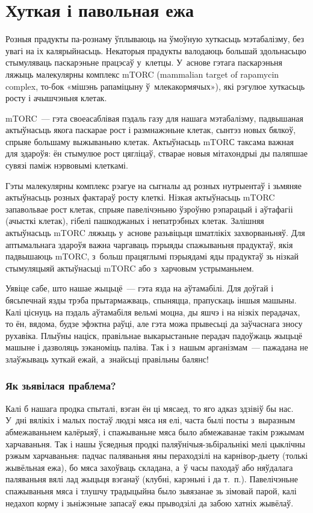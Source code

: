 \chapter{Хуткая і павольная ежа}

Розныя прадукты па-рознаму ўплываюць на ўмоўную хуткасьць мэтабалізму, без увагі на іх калярыйнасьць. Некаторыя прадукты валодаюць большай здольнасьцю стымуляваць паскарэньне працэсаў у~клетцы. У~аснове гэтага паскарэньня ляжыць малекулярны комплекс mTORC (mammalian target of rapamycin complex, то-бок «мішэнь рапаміцыну ў~млекакормячых»), які рэгулюе хуткасьць росту і ачышчэньня клетак.
 
mTORC~--- гэта своеасаблівая пэдаль газу для нашага мэтабалізму, падвышаная актыўнасьць якога паскарае рост і размнажэньне клетак, сынтэз новых бялкоў, спрыяе большаму выжываньню клетак. Актыўнасьць mTORС таксама важная для здароўя: ён стымулюе рост цягліцаў, стварае новыя мітахондрыі ды паляпшае сувязі паміж нэрвовымі клеткамі.

Гэты малекулярны комплекс рэагуе на сыгналы ад розных нутрыентаў і зьмяняе актыўнасьць розных фактараў росту клеткі. Нізкая актыўнасьць mTORC запавольвае рост клетак, спрыяе павелічэньню ўзроўню рэпарацый і аўтафагіі (ачысткі клетак), гібелі пашкоджаных і непатрэбных клетак. Залішняя актыўнасьць mTORC ляжыць у~аснове разьвіцьця шматлікіх захворваньняў. Для аптымальнага здароўя важна чаргаваць пэрыяды спажываньня прадуктаў, якія падвышаюць mTORC, з~больш працяглымі пэрыядамі яды прадуктаў зь нізкай стымуляцыяй актыўнасьці mTORC або з~харчовым устрыманьнем.

Уявіце сабе, што нашае жыцьцё~--- гэта язда на аўтамабілі. Для доўгай і бясьпечнай язды трэба прытармажваць, спыняцца, прапускаць іншыя машыны. Калі ціснуць на пэдаль аўтамабіля вельмі моцна, ды яшчэ і на нізкіх перадачах, то ён, вядома, будзе эфэктна раўці, але гэта можа прывесьці да заўчаснага зносу рухавіка. Плыўны націск, правільнае выкарыстаньне перадач падоўжаць жыцьцё машыне і дазволяць зэканоміць паліва. Так і з~нашым арганізмам~--- пажадана не злаўжываць хуткай ежай, а~знайсьці правільны балянс!

\subsection{Як зьявілася праблема?}

Калі б нашага продка спыталі, вэган ён ці мясаед, то яго адказ здзівіў бы нас. У~дні вялікіх і малых постаў людзі мяса ня елі, часта былі посты з~выразным абмежаваньнем калёрыяў, і спажываньне мяса было абмежаванае такім рэжымам харчаваньня. Так і нашы ўсяедныя продкі паляўнічыя-зьбіральнікі мелі цыклічны рэжым харчаваньня: падчас паляваньня яны пераходзілі на карнівор-дыету (толькі жывёльная ежа), бо мяса захоўваць складана, а~ў часы паходаў або няўдалага паляваньня вялі лад жыцьця вэганаў (клубні, карэньні і да т.~п.). Павелічэньне спажываньня мяса і тлушчу традыцыйна было зьвязанае зь зімовай парой, калі недахоп корму і зьніжэньне запасаў ежы прыводзілі да забою хатніх жывёлаў.

